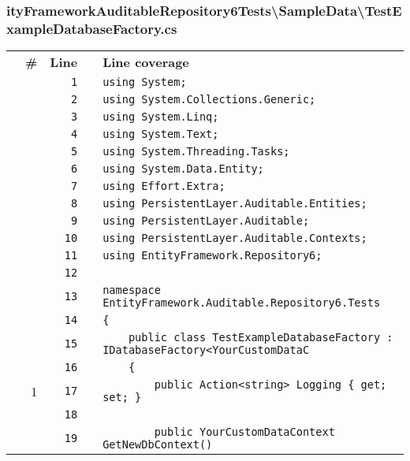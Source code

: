 \documentclass[a4paper,10pt]{article}
\begin{document}
\subsubsection{ityFrameworkAuditableRepository6Tests\textbackslash SampleData\textbackslash TestExampleDatabaseFactory.cs}
\begin{longtable}[l]{lrrll}
\textbf{} & \textbf{\#} & \textbf{Line} & \textbf{} & \textbf{Line coverage}\\
\cellcolor{gray} &  & \verb~1~ & & \verb~using System;~\\
\cellcolor{gray} &  & \verb~2~ & & \verb~using System.Collections.Generic;~\\
\cellcolor{gray} &  & \verb~3~ & & \verb~using System.Linq;~\\
\cellcolor{gray} &  & \verb~4~ & & \verb~using System.Text;~\\
\cellcolor{gray} &  & \verb~5~ & & \verb~using System.Threading.Tasks;~\\
\cellcolor{gray} &  & \verb~6~ & & \verb~using System.Data.Entity;~\\
\cellcolor{gray} &  & \verb~7~ & & \verb~using Effort.Extra;~\\
\cellcolor{gray} &  & \verb~8~ & & \verb~using PersistentLayer.Auditable.Entities;~\\
\cellcolor{gray} &  & \verb~9~ & & \verb~using PersistentLayer.Auditable;~\\
\cellcolor{gray} &  & \verb~10~ & & \verb~using PersistentLayer.Auditable.Contexts;~\\
\cellcolor{gray} &  & \verb~11~ & & \verb~using EntityFramework.Repository6;~\\
\cellcolor{gray} &  & \verb~12~ & & \verb~~\\
\cellcolor{gray} &  & \verb~13~ & & \verb~namespace EntityFramework.Auditable.Repository6.Tests~\\
\cellcolor{gray} &  & \verb~14~ & & \verb~{~\\
\cellcolor{gray} &  & \verb~15~ & & \verb~    public class TestExampleDatabaseFactory : IDatabaseFactory<YourCustomDataC~\\
\cellcolor{gray} &  & \verb~16~ & & \verb~    {~\\
\cellcolor{green} & 1 & \verb~17~ & & \verb~        public Action<string> Logging { get; set; }~\\
\cellcolor{gray} &  & \verb~18~ & & \verb~~\\
\cellcolor{gray} &  & \verb~19~ & & \verb~        public YourCustomDataContext GetNewDbContext()~\\

\end{longtable}
\end{document}
